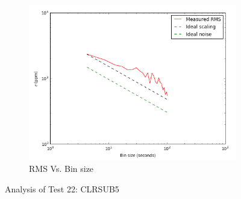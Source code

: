 \documentclass{aastex6}
\begin{document}
\begin{figure}[H]
    \begin{subfigure}{3}
        \includegraphics[scale=0.6]{rms_test22}
        \caption{RMS Vs. Bin size}
    \end{subfigure}
    \caption{Analysis of Test 22: CLRSUB5}
\end{figure}
\end{document}
